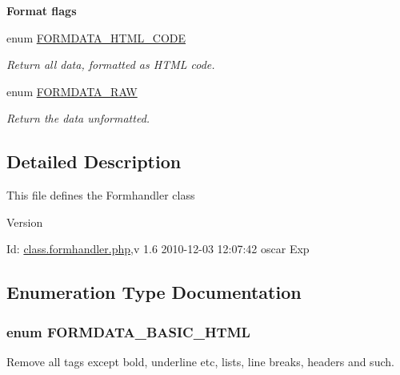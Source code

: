 \begin{Indent}{\bf Format flags}
\begin{DoxyCompactItemize}
enum \hyperlink{class_8formhandler_8php_a73c85f0f80e1060e1adf1efb73639845}{FORMDATA\_\-HTML\_\-CODE} 
\begin{DoxyCompactList}\small\item\em Return all data, formatted as HTML code. \item\end{DoxyCompactList}\item 
enum \hyperlink{class_8formhandler_8php_a982c2cfab5717a3b68087a346cd4addd}{FORMDATA\_\-RAW} 
\begin{DoxyCompactList}\small\item\em Return the data unformatted. \item\end{DoxyCompactList}\end{DoxyCompactItemize}
\end{Indent}


\subsection{Detailed Description}
This file defines the Formhandler class \begin{DoxyVersion}{Version}

\end{DoxyVersion}
\begin{DoxyParagraph}{Id:}
\hyperlink{class_8formhandler_8php}{class.formhandler.php},v 1.6 2010-\/12-\/03 12:07:42 oscar Exp 
\end{DoxyParagraph}


\subsection{Enumeration Type Documentation}
\subsubsection[{FORMDATA\_\-BASIC\_\-HTML}]{\setlength{\rightskip}{0pt plus 5cm}enum {\bf FORMDATA\_\-BASIC\_\-HTML}}\label{class_8formhandler_8php_a274bb2c8e23d075b189f143adbb6746e}


Remove all tags except bold, underline etc, lists, line breaks, headers and such. 

